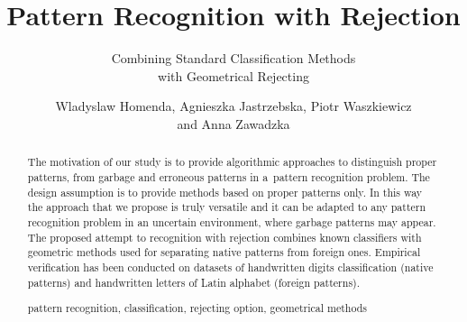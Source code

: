 \documentclass{llncs}
\newcommand{\keywords}[1]{\par\addvspace\baselineskip
\noindent\keywordname\enspace\ignorespaces#1}
\begin{document}
\title{Pattern Recognition with Rejection}
\subtitle{Combining Standard Classification Methods\\with Geometrical Rejecting}

%

\author{Wladyslaw Homenda, Agnieszka Jastrzebska, Piotr Waszkiewicz\\ and Anna Zawadzka}
%

\vspace{-6pt}
\vspace{-6pt}
\maketitle
\vspace{-6pt}

\pagestyle{empty}  %

\begin{abstract}
\vspace{-12pt}
The motivation of our study is to provide algorithmic approaches to distinguish proper patterns, from garbage and erroneous patterns in a~pattern recognition problem. The design assumption is to provide methods based on proper patterns only. In this way the approach that we propose is truly versatile and it can be adapted to any pattern recognition problem in an uncertain environment, where garbage patterns may appear. The proposed attempt to recognition with rejection combines known classifiers with geometric methods used for separating native patterns from foreign ones. Empirical verification has been conducted on datasets of handwritten digits classification (native patterns) and handwritten letters of Latin alphabet (foreign patterns).
\vspace{-6pt}
\keywords pattern recognition, classification, rejecting option, geometrical methods
\vspace{-6pt}
\end{abstract}
\end{document}
